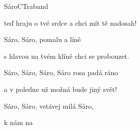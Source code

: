 \begin{song}{Sáro}{C}{Traband}
\begin{SBVerse}
teď hraju o tvé srdce a chci mít tě nadosah!

\end{SBVerse}

\begin{SBChorus}

Sáro, Sáro, pomalu a líně 

s hlavou na tvém klíně chci se probouzet. 

Sáro, Sáro, Sáro, Sáro rosa padá ráno 

a v poledne už možná bude jiný svět!

\end{SBChorus}

\begin{SBVerse}

Sáro, Sáro, vstávej milá Sáro, 

 k nám  na 

\end{SBVerse}

\end{song}

\pagebreak
